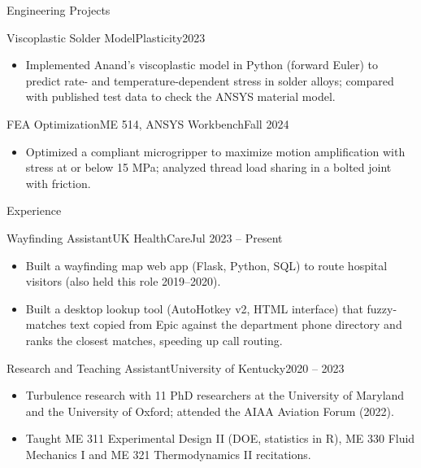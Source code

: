 \documentclass[]{mcdowellcv}
\begin{document}
\begin{cvsection}{Engineering Projects}
  \begin{cvsubsection}{Viscoplastic Solder Model}{Plasticity}{2023}
    \begin{itemize}
      \item Implemented Anand's viscoplastic model in Python (forward Euler) to predict rate- and temperature-dependent stress in solder alloys; compared with published test data to check the ANSYS material model.
    \end{itemize}
  \end{cvsubsection}

  \begin{cvsubsection}{FEA Optimization}{ME 514, ANSYS Workbench}{Fall 2024}
    \begin{itemize}
      \item Optimized a compliant microgripper to maximize motion amplification with stress at or below 15 MPa; analyzed thread load sharing in a bolted joint with friction.
    \end{itemize}
  \end{cvsubsection}
\end{cvsection}

\begin{cvsection}{Experience}
  \begin{cvsubsection}{Wayfinding Assistant}{UK HealthCare}{Jul 2023 -- Present}
    \begin{itemize}
      \item Built a wayfinding map web app (Flask, Python, SQL) to route hospital visitors (also held this role 2019--2020).
      \item Built a desktop lookup tool (AutoHotkey v2, HTML interface) that fuzzy-matches text copied from Epic against the department phone directory and ranks the closest matches, speeding up call routing.
    \end{itemize}
  \end{cvsubsection}

  \begin{cvsubsection}{Research and Teaching Assistant}{University of Kentucky}{2020 -- 2023}
    \begin{itemize}
      \item Turbulence research with 11 PhD researchers at the University of Maryland and the University of Oxford; attended the AIAA Aviation Forum (2022).
      \item Taught ME 311 Experimental Design II (DOE, statistics in R), ME 330 Fluid Mechanics I and ME 321 Thermodynamics II recitations.
    \end{itemize}
  \end{cvsubsection}
\end{cvsection}
\end{document}
